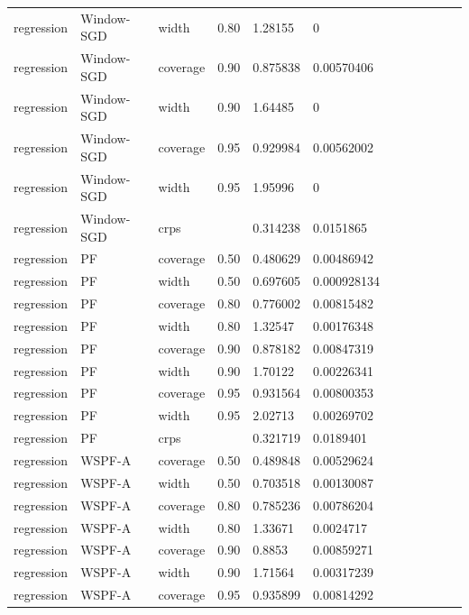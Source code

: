\begin{tabular}{llllllllllll}
regression & Window-SGD & width & 0.80 & 1.28155 & 0 &  &  &  &  &  &  \\
regression & Window-SGD & coverage & 0.90 & 0.875838 & 0.00570406 &  &  &  &  &  &  \\
regression & Window-SGD & width & 0.90 & 1.64485 & 0 &  &  &  &  &  &  \\
regression & Window-SGD & coverage & 0.95 & 0.929984 & 0.00562002 &  &  &  &  &  &  \\
regression & Window-SGD & width & 0.95 & 1.95996 & 0 &  &  &  &  &  &  \\
regression & Window-SGD & crps &  & 0.314238 & 0.0151865 &  &  &  &  &  &  \\
regression & PF & coverage & 0.50 & 0.480629 & 0.00486942 &  &  &  &  &  &  \\
regression & PF & width & 0.50 & 0.697605 & 0.000928134 &  &  &  &  &  &  \\
regression & PF & coverage & 0.80 & 0.776002 & 0.00815482 &  &  &  &  &  &  \\
regression & PF & width & 0.80 & 1.32547 & 0.00176348 &  &  &  &  &  &  \\
regression & PF & coverage & 0.90 & 0.878182 & 0.00847319 &  &  &  &  &  &  \\
regression & PF & width & 0.90 & 1.70122 & 0.00226341 &  &  &  &  &  &  \\
regression & PF & coverage & 0.95 & 0.931564 & 0.00800353 &  &  &  &  &  &  \\
regression & PF & width & 0.95 & 2.02713 & 0.00269702 &  &  &  &  &  &  \\
regression & PF & crps &  & 0.321719 & 0.0189401 &  &  &  &  &  &  \\
regression & WSPF-A & coverage & 0.50 & 0.489848 & 0.00529624 &  &  &  &  &  &  \\
regression & WSPF-A & width & 0.50 & 0.703518 & 0.00130087 &  &  &  &  &  &  \\
regression & WSPF-A & coverage & 0.80 & 0.785236 & 0.00786204 &  &  &  &  &  &  \\
regression & WSPF-A & width & 0.80 & 1.33671 & 0.0024717 &  &  &  &  &  &  \\
regression & WSPF-A & coverage & 0.90 & 0.8853 & 0.00859271 &  &  &  &  &  &  \\
regression & WSPF-A & width & 0.90 & 1.71564 & 0.00317239 &  &  &  &  &  &  \\
regression & WSPF-A & coverage & 0.95 & 0.935899 & 0.00814292 &  &  &  &  &  &  \\

\end{tabular}
